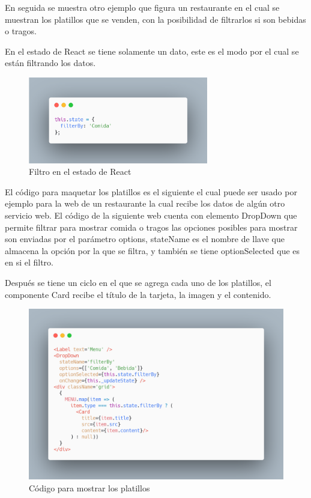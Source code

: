 En seguida se muestra otro ejemplo que figura un restaurante en el cual se muestran los platillos que se venden, con la posibilidad de filtrarlos si son bebidas o tragos.

En el estado de React se tiene solamente un dato, este es el modo por el cual se están filtrando los datos.
\newline
\begin{figure}[H]
    \includegraphics[width=0.7\textwidth]{./Imagenes/9.11-2}
   \centering 
    \caption[Filtro en el estado de React]{Filtro en el estado de React}
    \end{figure}
\newline

El código para maquetar los platillos es el siguiente el cual puede ser usado por ejemplo para la web de un restaurante la cual recibe los datos de algún otro servicio web.
El código de la siguiente web cuenta con elemento DropDown que permite filtrar para mostrar comida o tragos las opciones posibles para mostrar son enviadas por el parámetro options, stateName es el nombre de llave que almacena la opción por la que se filtra, y también se tiene optionSelected que es en si el filtro.

Después se tiene un ciclo en el que se agrega cada uno de los platillos, el componente Card recibe el título de la tarjeta, la imagen y el contenido.
\newline
\begin{figure}[H]
    \includegraphics[width=1\textwidth]{./Imagenes/9.12.png}
   \centering 
    \caption[Código para mostrar los platillos]{Código para mostrar los platillos}
    \end{figure}
\newline

